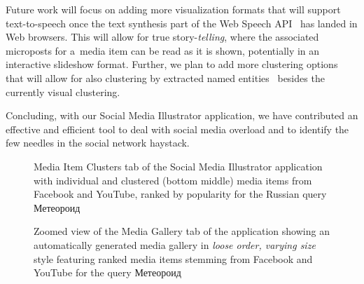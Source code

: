 \documentclass{sig-alternate}
\begin{document}
Future work will focus on adding more visualization formats that will support
text-to-speech once the text synthesis part
of the Web Speech API~\cite{shires2012webspeech} has landed in Web browsers.
This will allow for true story-\emph{telling}, where the associated microposts
for a~media item can be read as it is shown,
potentially in an interactive slideshow format.
Further, we plan to add more clustering options
that will allow for also clustering by extracted named entities~%
\cite{steiner2011addingmeaning} besides the currently visual clustering.

Concluding, with our Social Media Illustrator application, 
we have contributed an effective and efficient tool
to deal with social media overload
and to identify the few needles in the social network haystack. 

\begin{figure}[t!]
  \centering
  \setlength{\fboxsep}{1pt}
  \caption{Media Item Clusters tab of the Social Media Illustrator application
  with individual and clustered (bottom middle) media items from Facebook and YouTube,
  ranked by popularity for the Russian query
    \selectfont Метеороид \selectfont}
  \label{fig:application}
\end{figure}

\begin{figure}[t!]
  \centering
  \setlength{\fboxsep}{1pt}
  \caption{Zoomed view of the Media Gallery tab of the application
    showing an automatically generated media gallery in \emph{loose order, varying size} style
    featuring ranked media items stemming from Facebook and YouTube for the query
    \selectfont Метеороид \selectfont}
  \label{fig:media-gallery}
\end{figure}



\end{document}
